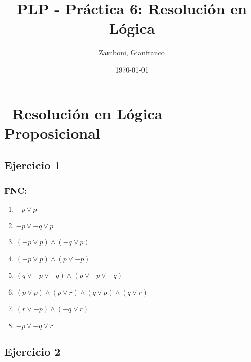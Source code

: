 \documentclass[10pt,a4paper]{article}
\begin{document}
  \title{PLP - Práctica 6: Resolución en Lógica}

  \date{\today}

  \author{Zamboni, Gianfranco}

  \maketitle
  \setcounter{page}{1}

  \section*{\ Resolución en Lógica Proposicional}
  \subsection{Ejercicio 1}
    \subsubsection{FNC:}
    \begin{enumerate}
    \item $-p \vee p$
    \item $-p \vee -q \vee p$
    \item $(-p \vee p) \wedge (-q \vee p)$
    \item $(-p \vee p) \wedge (p \vee -p)$
    \item $(q \vee -p \vee -q) \wedge (p \vee -p \vee -q)$
    \item $(p \vee p) \wedge (p \vee r) \wedge (q \vee p) \wedge (q \vee r)$
    \item $(r \vee -p) \wedge (-q \vee r)$
    \item $-p \vee -q \vee r$
    \end{enumerate}
    \subsubsection{}
  \subsection{Ejercicio 2}
\end{document}
